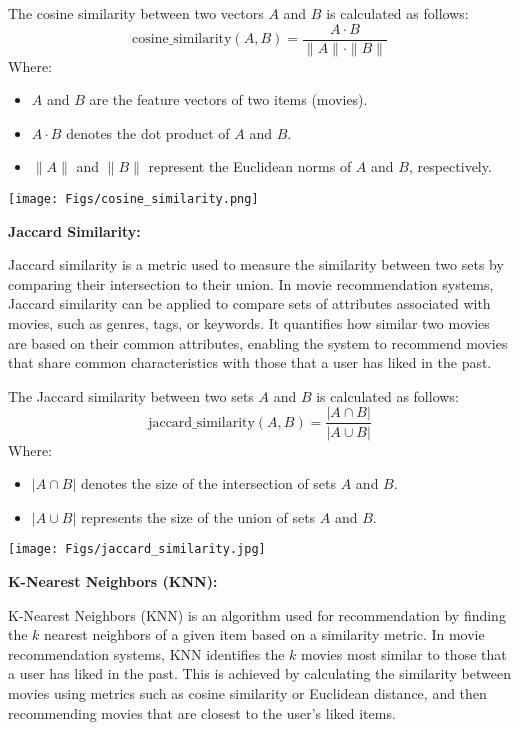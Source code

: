 \documentclass[a4paper]{article}
\theoremstyle{plain}
\theoremstyle{definition}
\begin{document}
The cosine similarity between two vectors $A$ and $B$ is calculated as follows:
\[
\text{cosine\_similarity}(A, B) = \frac{{A \cdot B}}{{\|A\| \cdot \|B\|}}
\]
Where:
\begin{itemize}
    \item $A$ and $B$ are the feature vectors of two items (movies).
    \item $A \cdot B$ denotes the dot product of $A$ and $B$.
    \item $\|A\|$ and $\|B\|$ represent the Euclidean norms of $A$ and $B$, respectively.
\end{itemize}
\texttt{[image: Figs/cosine\_similarity.png]}


\bigskip

\textbf{\large \color[RGB]{50,50,50} Jaccard Similarity:}


Jaccard similarity is a metric used to measure the similarity between two sets by comparing their intersection to their union. In movie recommendation systems, Jaccard similarity can be applied to compare sets of attributes associated with movies, such as genres, tags, or keywords. It quantifies how similar two movies are based on their common attributes, enabling the system to recommend movies that share common characteristics with those that a user has liked in the past.


The Jaccard similarity between two sets $A$ and $B$ is calculated as follows:
\[
\text{jaccard\_similarity}(A, B) = \frac{{|A \cap B|}}{{|A \cup B|}}
\]
Where:
\begin{itemize}
    \item $|A \cap B|$ denotes the size of the intersection of sets $A$ and $B$.
    \item $|A \cup B|$ represents the size of the union of sets $A$ and $B$.
\end{itemize}
\texttt{[image: Figs/jaccard\_similarity.jpg]}

\bigskip


\textbf{\large \color[RGB]{50,50,50} K-Nearest Neighbors (KNN):}


K-Nearest Neighbors (KNN) is an algorithm used for recommendation by finding the $k$ nearest neighbors of a given item based on a similarity metric. In movie recommendation systems, KNN identifies the $k$ movies most similar to those that a user has liked in the past. This is achieved by calculating the similarity between movies using metrics such as cosine similarity or Euclidean distance, and then recommending movies that are closest to the user's liked items.
\end{document}
